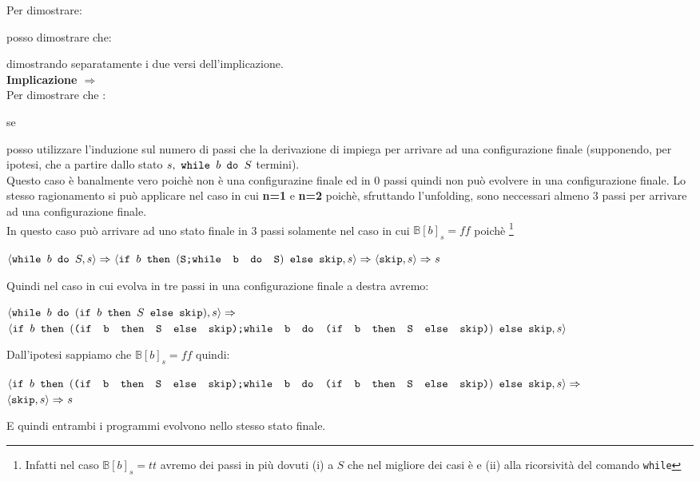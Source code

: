 {
	Per dimostrare:
	\begin{center}
	\exFour{}
	\end{center}
	posso dimostrare che:
	\begin{center}
	\exFourIff{}
	\end{center}
	dimostrando separatamente i due versi dell'implicazione. \\
	
	\textbf{Implicazione $\Longrightarrow{}$} \\
	Per dimostrare che :
	\begin{center}
	se \exFourLtR{}
	\end{center}
	posso utilizzare l'induzione sul numero di passi che la derivazione di 
	 impiega per arrivare ad una configurazione finale 
	(supponendo, per ipotesi, che a partire dallo stato $s,~\wbS{b}{S}$
	termini).\\
	
	 Questo caso è banalmente vero poichè 
	 non è una configurazine finale ed in 0 passi quindi
	non può evolvere in una configurazione finale. Lo stesso ragionamento si
	può applicare nel caso in cui \textbf{n=1} e \textbf{n=2} poichè,
	sfruttando l'unfolding, sono neccessari almeno 3 passi per arrivare ad una
	configurazione finale.\\
	
	 In questo caso  può arrivare ad uno stato finale
	in 3 passi solamente nel caso in cui $\mathbb{B}[b]_s=ff$ poichè
	\footnote{Infatti nel caso $\mathbb{B}[b]_s=tt$ avremo dei passi in più 
	dovuti (i) a $S$ che nel migliore dei casi è \skipistr{} e (ii) alla
	ricorsività del comando \texttt{while}}
	\begin{center}
	$\confSs{\wbS{b}{S}}{s}\Rar{}
	\confSs{
		\ifABC{b}
			{(\concat{S}{\wbS{b}{S}})}
			{\skipistr}
	}{s}\Rar{}
	\confSs{\skipistr}{s}\Rar{}s$
	\end{center}
	Quindi nel caso in cui  evolva in tre passi in una
	configurazione finale a destra avremo:
	\begin{center}
	$\confSs{\wbS{b}{(\ifABC{b}{S}{\skipistr})}}{s}\Rar{}$\\
	$\confSs{
		\ifABC{b}
		{(\concat{(\ifABC{b}{S}{\skipistr})}
		{\wbS{b}{(\ifABC{b}{S}{\skipistr})}})}
		{\skipistr}
	}{s}$
	\end{center}
	Dall'ipotesi sappiamo che $\mathbb{B}[b]_s=ff$ quindi:
	\begin{center}
	$\confSs{
		\ifABC{b}
		{(\concat{(\ifABC{b}{S}{\skipistr})}
		{\wbS{b}{(\ifABC{b}{S}{\skipistr})}})}
		{\skipistr}
	}{s}\Rar{}$ \\
	$\confSs{\skipistr}{s}\Rar{}{s}$
	\end{center}
	E quindi entrambi i programmi evolvono nello stesso stato finale.\\

}

